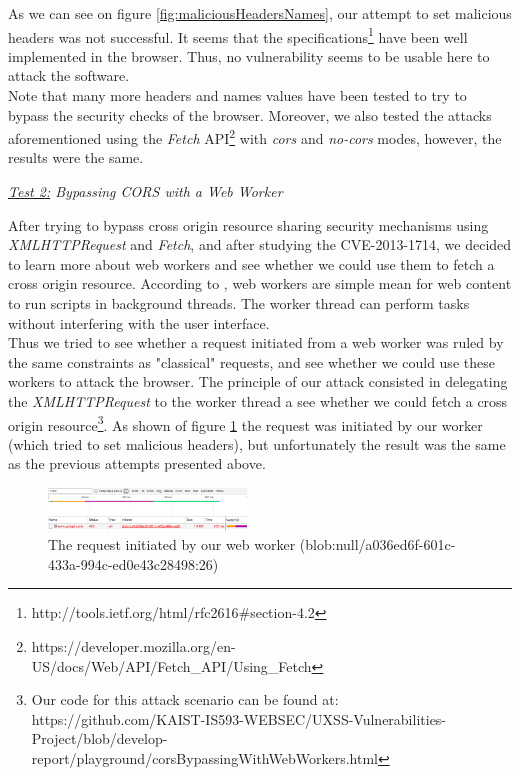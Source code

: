 \documentclass[journal]{IEEEtran}
\begin{document}
As we can see on figure \ref{fig:maliciousHeadersNames}, our attempt to set malicious headers was not successful. It seems that the specifications\footnote{http://tools.ietf.org/html/rfc2616\#section-4.2} have been well implemented in the browser. Thus, no vulnerability seems to be usable here to attack the software. \\

Note that many more headers and names values have been tested to try to bypass the security checks of the browser. Moreover, we also tested the attacks aforementioned using the \emph{Fetch} API\footnote{https://developer.mozilla.org/en-US/docs/Web/API/Fetch\_API/Using\_Fetch} with \emph{cors} and \emph{no-cors} modes, however, the results were the same.

\medskip

\emph{\underline{Test 2:} Bypassing CORS with a Web Worker}

After trying to bypass cross origin resource sharing security mechanisms using \emph{XMLHTTPRequest} and \emph{Fetch}, and after studying the CVE-2013-1714, we decided to learn more about web workers and see whether we could use them to fetch a cross origin resource. According to \cite{webWorkers}, web workers are simple mean for web content to run scripts in background threads. The worker thread can perform tasks without interfering with the user interface. \\
Thus we tried to see whether a request initiated from a web worker was ruled by the same constraints as "classical" requests, and see whether we could use these workers to attack the browser. The principle of our attack consisted in delegating the \emph{XMLHTTPRequest} to the worker thread a see whether we could fetch a cross origin resource\footnote{Our code for this attack scenario can be found at: https://github.com/KAIST-IS593-WEBSEC/UXSS-Vulnerabilities-Project/blob/develop-report/playground/corsBypassingWithWebWorkers.html}. As shown of figure \ref{fig:corsWithWebWorkers} the request was initiated by our worker (which tried to set malicious headers), but unfortunately the result was the same as the previous attempts presented above.

\begin{figure}[h]
\centering
\includegraphics[width=0.47\textwidth]{images/corsWithWebWorkers.png}
\caption{The request initiated by our web worker (blob:null/a036ed6f-601c-433a-994c-ed0e43c28498:26)}
\label{fig:corsWithWebWorkers}
\end{figure}
\end{document}
